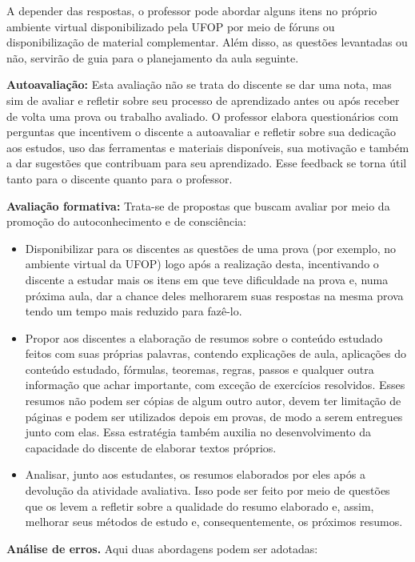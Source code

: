 \documentclass[
	12pt,				%
	openright,			%
	oneside,			%
	a4paper,			%
	english,			%
	brazil				%
	]{abntex2}
\begin{document}
A depender das respostas, o professor pode abordar alguns itens no próprio ambiente virtual disponibilizado pela UFOP por meio de fóruns ou disponibilização de material complementar. Além disso, as questões levantadas ou não, servirão de guia para o planejamento da aula seguinte.

\noindent \textbf{Autoavaliação:} Esta avaliação não se trata do discente se dar uma nota, mas sim de avaliar e refletir sobre seu processo de aprendizado antes ou após receber de volta uma prova ou trabalho avaliado. O professor elabora questionários com perguntas que incentivem o discente a autoavaliar e refletir sobre sua dedicação aos estudos, uso das ferramentas e materiais disponíveis, sua motivação e também a dar sugestões que contribuam para seu aprendizado. Esse feedback se torna útil tanto para o discente quanto para o professor.

\noindent \textbf{Avaliação formativa:} Trata-se de propostas que buscam avaliar por meio da promoção do autoconhecimento e de consciência:
\begin{itemize}
    \item Disponibilizar para os discentes as questões de uma prova (por exemplo, no ambiente virtual da UFOP) logo após a realização desta, incentivando o discente a estudar mais os itens em que teve dificuldade na prova e, numa próxima aula, dar a chance deles melhorarem suas respostas na mesma prova tendo um tempo mais reduzido para fazê-lo.
    \item Propor aos discentes a elaboração de resumos sobre o conteúdo estudado feitos com suas próprias palavras, contendo explicações de aula, aplicações do conteúdo estudado, fórmulas, teoremas, regras, passos e qualquer outra informação que achar importante, com exceção de exercícios resolvidos. Esses resumos não podem ser cópias de algum outro autor, devem ter limitação de páginas e podem ser utilizados depois em provas, de modo a serem entregues junto com elas. Essa estratégia também auxilia no desenvolvimento da capacidade do discente de elaborar textos próprios.
    \item Analisar, junto aos estudantes, os resumos elaborados por eles após a devolução da atividade avaliativa. Isso pode ser feito por meio de questões que os levem a refletir sobre a qualidade do resumo elaborado e, assim, melhorar seus métodos de estudo e, consequentemente, os próximos resumos.
\end{itemize}

\noindent \textbf{Análise de erros.} Aqui duas abordagens podem ser adotadas:
\end{document}
